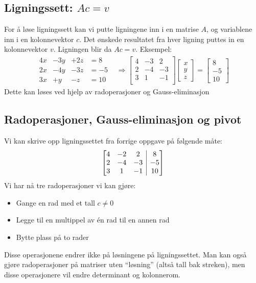 \documentclass[12pt,a4paper,norsk]{article}
\makeatletter
\newcommand{\mat}[2]{\left[\begin{array}{@{}#1@{}}#2\end{array}\right]}
\makeatother
\begin{document}
\subsection{Ligningssett: $Ac = v$}
For å løse ligningssett kan vi putte ligningene inn i en matrise $A$, og variablene
inn i en kolonnevektor $c$. Det ønskede resultatet fra hver ligning puttes in en
kolonnevektor $v$. Ligningen blir da $Ac = v$. Eksempel:
\begin{align*}
  \begin{array}{cccc}
    4x &- 3y &+ 2z &= 8 \\
    2x &- 4y &- 3z &= -5 \\
    3x &+ y &- z &= 10
  \end{array}
       &\Longrightarrow
  \begin{bmatrix}
    4 & -3 & 2\\
    2 & -4 & -3\\
    3 & 1 & -1\\
  \end{bmatrix}
  \begin{bmatrix}
    x \\ y \\ z
  \end{bmatrix}
       =
  \begin{bmatrix}
    8 \\ -5 \\ 10
  \end{bmatrix}
\end{align*}
%
Dette kan løses ved hjelp av radoperasjoner og Gauss-eliminasjon

\subsection{Radoperasjoner, Gauss-eliminasjon og pivot}
Vi kan skrive opp ligningssettet fra forrige oppgave på følgende måte:
\[\mat{ccc|c}{4 & -2 & 2 & 8 \\ 2 & -4 & -3 & -5 \\ 3 & 1 & -1 & 10}\]
Vi har nå tre radoperasjoner vi kan gjøre:
\begin{itemize}
  \item Gange en rad med et tall $c \ne 0$
  \item Legge til en multippel av én rad til en annen rad
  \item Bytte plass på to rader
\end{itemize}
Disse operasjonene endrer ikke på løsningene på ligningssettet. Man kan også
gjøre radoperasjoner på matriser uten ``løsning'' (altså tall bak streken), men disse
operasjonere vil endre determinant og kolonnerom.
\end{document}
